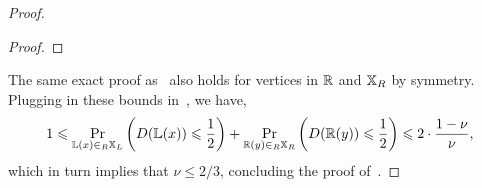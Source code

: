 \begin{proof}
\begin{proof}
\end{proof}

The same exact proof as~ also holds for vertices in $\mathbb{R}$ and $\mathbb{X}_R$ by symmetry. Plugging in these bounds in~, we have, 
\[
	1 \leqslant \operatorname*{\textnormal{Pr}}_{\mathbb{L}(x) \in_R \mathbb{X}_L}\left(D(\mathbb{L}(x)) \leqslant \frac12\right) + \operatorname*{\textnormal{Pr}}_{\mathbb{R}(y) \in_R \mathbb{X}_R}\left(D(\mathbb{R}(y)) \leqslant \frac12\right) \leqslant 2 \cdot \frac{1-\nu}{\nu},
\]
which in turn implies that $\nu \leq  2/3$, concluding the proof of~. 
\end{proof}
